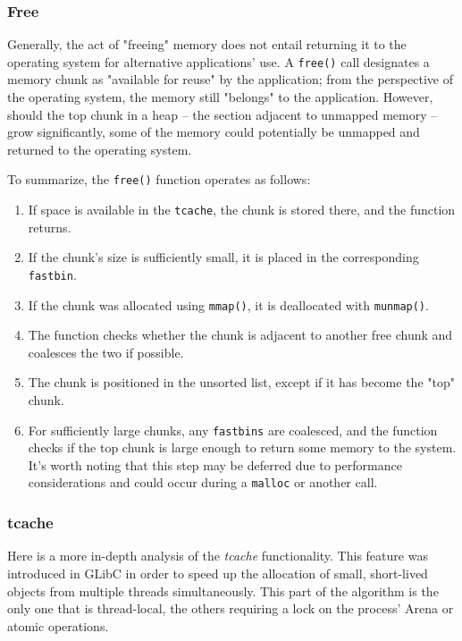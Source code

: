 \documentclass{article}
\begin{document}
\subsubsection{Free}
Generally, the act of "freeing" memory does not entail returning it to the operating system for alternative applications' use. A \texttt{free()} call designates a memory chunk as "available for reuse" by the application; from the perspective of the operating system, the memory still "belongs" to the application. However, should the top chunk in a heap -- the section adjacent to unmapped memory -- grow significantly, some of the memory could potentially be unmapped and returned to the operating system.

To summarize, the \texttt{free()} function operates as follows:

\begin{enumerate}
\item If space is available in the \texttt{tcache}, the chunk is stored there,
and the function returns.

\item If the chunk's size is sufficiently small, it is placed in the
corresponding \texttt{fastbin}.

\item If the chunk was allocated using \texttt{mmap()}, it is deallocated with
\texttt{munmap()}.

\item The function checks whether the chunk is adjacent to another free chunk
and coalesces the two if possible.

\item The chunk is positioned in the unsorted list, except if it has become the
"top" chunk.

\item For sufficiently large chunks, any \texttt{fastbins} are coalesced, and
the function checks if the top chunk is large enough to return some memory to
the system. It's worth noting that this step may be deferred due to performance
considerations and could occur during a \texttt{malloc} or another call.
\end{enumerate}

\subsubsection{tcache}
Here is a more in-depth analysis of the \emph{tcache} functionality. This feature was introduced in GLibC in order to speed up the allocation of small, short-lived objects from multiple threads simultaneously. This part of the algorithm is the only one that is thread-local, the others requiring a lock on the process' Arena or atomic operations.
\end{document}
